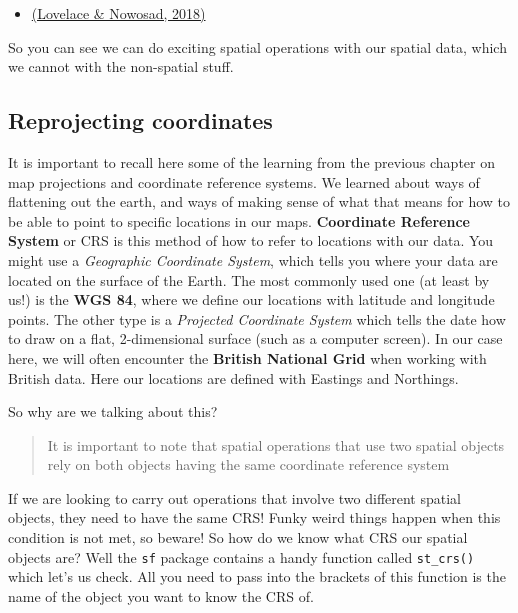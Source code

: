 \documentclass[
]{book}
\providecommand{\tightlist}{%
  \setlength{\itemsep}{0pt}\setlength{\parskip}{0pt}}
\begin{document}
\begin{itemize}
\tightlist
\item
  \href{https://geocompr.robinlovelace.net/spatial-operations.html}{(Lovelace \& Nowosad, 2018)}
\end{itemize}

So you can see we can do exciting spatial operations with our spatial data, which we cannot with the non-spatial stuff.

\hypertarget{reprojecting-coordinates}{%
\subsection{Reprojecting coordinates}\label{reprojecting-coordinates}}

It is important to recall here some of the learning from the previous chapter on map projections and coordinate reference systems. We learned about ways of flattening out the earth, and ways of making sense of what that means for how to be able to point to specific locations in our maps. \textbf{Coordinate Reference System} or CRS is this method of how to refer to locations with our data. You might use a \emph{Geographic Coordinate System}, which tells you where your data are located on the surface of the Earth. The most commonly used one (at least by us!) is the \textbf{WGS 84}, where we define our locations with latitude and longitude points. The other type is a \emph{Projected Coordinate System} which tells the date how to draw on a flat, 2-dimensional surface (such as a computer screen). In our case here, we will often encounter the \textbf{British National Grid} when working with British data. Here our locations are defined with Eastings and Northings.

So why are we talking about this?

\begin{quote}
It is important to note that spatial operations that use two spatial objects rely on both objects having the same coordinate reference system
\end{quote}

If we are looking to carry out operations that involve two different spatial objects, they need to have the same CRS! Funky weird things happen when this condition is not met, so beware! So how do we know what CRS our spatial objects are? Well the \texttt{sf} package contains a handy function called \texttt{st\_crs()} which let's us check. All you need to pass into the brackets of this function is the name of the object you want to know the CRS of.
\end{document}
